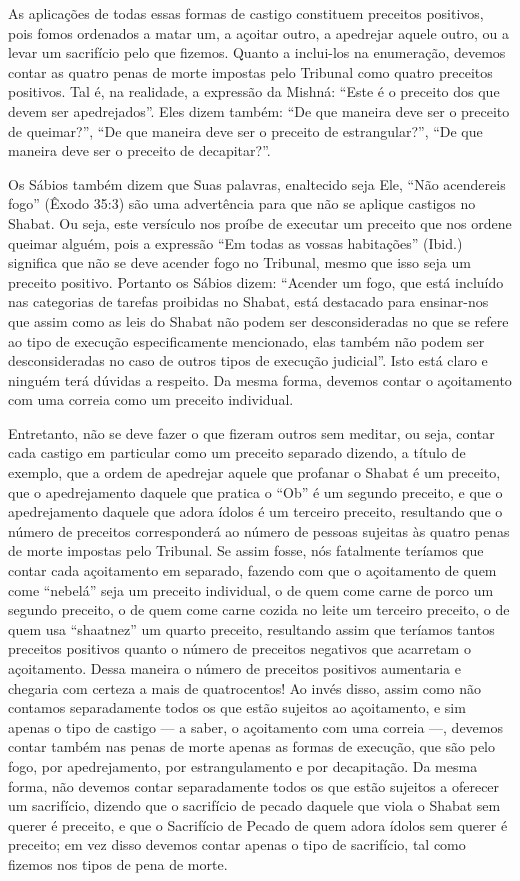 As aplicações de todas essas formas de castigo constituem preceitos
positivos, pois fomos ordenados a matar um, a açoitar outro, a apedrejar
aquele outro, ou a levar um sacrifício pelo que fizemos. Quanto a
inclui-los na enumeração, devemos contar as quatro penas de morte
impostas pelo Tribunal como quatro preceitos positivos. Tal é, na
realidade, a expressão da Mishná: ``Este é o preceito dos que devem ser
apedrejados''. Eles dizem também: ``De que maneira deve ser o preceito
de queimar?'', ``De que maneira deve ser o preceito de estrangular?'',
``De que maneira deve ser o preceito de decapitar?''.

Os Sábios também dizem que Suas palavras, enaltecido seja Ele, ``Não
acendereis fogo'' (Êxodo 35:3) são uma advertência para que não se
aplique castigos no Shabat. Ou seja, este versículo nos proíbe de
executar um preceito que nos ordene queimar alguém, pois a expressão
``Em todas as vossas habitações'' (Ibid.) significa que não se deve
acender fogo no Tribunal, mesmo que isso seja um preceito positivo.
Portanto os Sábios dizem: ``Acender um fogo, que está incluído nas
categorias de tarefas proibidas no Shabat, está destacado para
ensinar-nos que assim como as leis do Shabat não podem ser
desconsideradas no que se refere ao tipo de execução especificamente
mencionado, elas também não podem ser desconsideradas no caso de outros
tipos de execução judicial''. Isto está claro e ninguém terá dúvidas a
respeito. Da mesma forma, devemos contar o açoitamento com uma correia
como um preceito individual.

Entretanto, não se deve fazer o que fizeram outros sem meditar, ou seja,
contar cada castigo em particular como um preceito separado dizendo, a
título de exemplo, que a ordem de apedrejar aquele que profanar o Shabat
é um preceito, que o apedrejamento daquele que pratica o ``Ob'' é um
segundo preceito, e que o apedrejamento daquele que adora ídolos é um
terceiro preceito, resultando que o número de preceitos corresponderá ao
número de pessoas sujeitas às quatro penas de morte impostas pelo
Tribunal. Se assim fosse, nós fatalmente teríamos que contar cada
açoitamento em separado, fazendo com que o açoitamento de quem come
``nebelá'' seja um preceito individual, o de quem come carne de porco um
segundo preceito, o de quem come carne cozida no leite um terceiro
preceito, o de quem usa ``shaatnez'' um quarto preceito, resultando
assim que teríamos tantos preceitos positivos quanto o número de
preceitos negativos que acarretam o açoitamento. Dessa maneira o número
de preceitos positivos aumentaria e chegaria com certeza a mais de
quatrocentos! Ao invés disso, assim como não contamos separadamente
todos os que estão sujeitos ao açoitamento, e sim apenas o tipo de
castigo --- a saber, o açoitamento com uma correia ---, devemos contar
também nas penas de morte apenas as formas de execução, que são pelo
fogo, por apedrejamento, por estrangulamento e por decapitação. Da
mesma forma, não devemos contar separadamente todos os que estão
sujeitos a oferecer um sacrifício, dizendo que o sacrifício de pecado
daquele que viola o Shabat sem querer é preceito, e que o Sacrifício de
Pecado de quem adora ídolos sem querer é preceito; em vez disso devemos
contar apenas o tipo de sacrifício, tal como fizemos nos tipos de pena
de morte.


